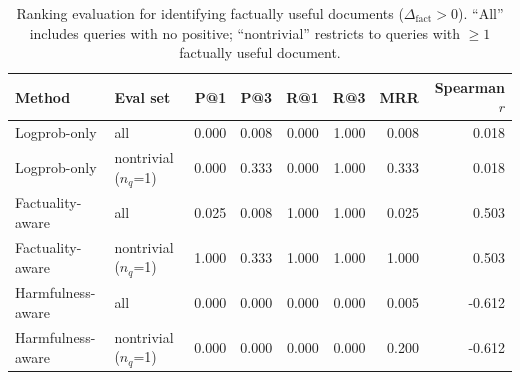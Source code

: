 \begin{table}[h]
\centering\small
\begin{tabular}{llrrrrrr}
\toprule
Method & Eval set & P@1 & P@3 & R@1 & R@3 & MRR & Spearman $r$ \\
\midrule
  Logprob-only & all & 0.000 & 0.008 & 0.000 & 1.000 & 0.008 & 0.018 \\
  Logprob-only & nontrivial ($n_q$=1) & 0.000 & 0.333 & 0.000 & 1.000 & 0.333 & 0.018 \\
  Factuality-aware & all & 0.025 & 0.008 & 1.000 & 1.000 & 0.025 & 0.503 \\
  Factuality-aware & nontrivial ($n_q$=1) & 1.000 & 0.333 & 1.000 & 1.000 & 1.000 & 0.503 \\
  Harmfulness-aware & all & 0.000 & 0.000 & 0.000 & 0.000 & 0.005 & -0.612 \\
  Harmfulness-aware & nontrivial ($n_q$=1) & 0.000 & 0.000 & 0.000 & 0.000 & 0.200 & -0.612 \\
\bottomrule
\end{tabular}
\caption{Ranking evaluation for identifying factually useful documents ($\Delta_{\text{fact}} > 0$). ``All'' includes queries with no positive; ``nontrivial'' restricts to queries with $\geq 1$ factually useful document.}
\label{tab:e6_ranking}
\end{table}
